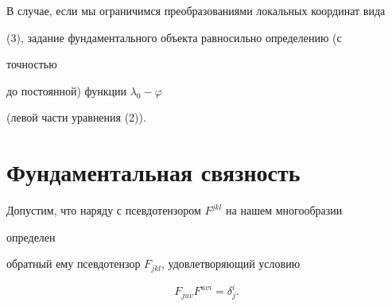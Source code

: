  


В случае, если мы ограничимся преобразованиями локальных координат вида 


(3), задание фундаментального объекта равносильно определению (с 


точностью  


до постоянной) функции $\lambda_0-\varphi$ 


(левой части уравнения (2)). 


 


\section{Фундаментальная связность} 


 


Допустим, что наряду с псевдотензором $F^{jkl}$ на нашем многообразии 


определен  


обратный ему псевдотензор $F_{jkl}$, удовлетворяющий условию 


$$ 


F_{juv}F^{uvi}=\delta^i_j. 


$$ 


 


